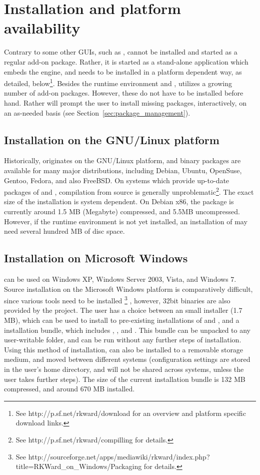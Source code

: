 \section{Installation and platform availability}
\label{sec:installing_starting_RKWard}
Contrary to some other  GUIs, such as ,  cannot be installed and started as a
regular  add-on package. Rather, it is started as a stand-alone application which embeds the
 engine, and needs to be installed in a platform dependent way, as detailed, below\footnote{
  See http://p.sf.net/rkward/download for an overview and platform specific download links.
}. Besides the
 runtime environment and ,  utilizes a growing number of  add-on packages.
However, these do not have to be installed before hand. Rather  will prompt the user to install
missing packages, interactively, on an as-needed basis (see Section~\ref{sec:package_management}).

\subsection{Installation on the GNU/Linux platform}
Historically,  originates on the GNU/Linux platform, and binary packages are available for many major
distributions, including Debian, Ubuntu, OpenSuse, Gentoo, Fedora, and also FreeBSD. On systems which
provide up-to-date packages of  and , compilation from source is generally unproblematic\footnote{
  See http://p.sf.net/rkward/compilling for details.
}. The exact size of the installation is system dependent. On Debian x86, the package is currently around 1.5 MB (Megabyte) compressed,
and 5.5MB uncompressed. However, if the  runtime environment is not yet installed, an installation of  may
need several hundred MB of disc space.

\subsection{Installation on Microsoft Windows}
 can be used on Windows XP, Windows Server 2003, Vista, and Windows 7. Source installation on the
Microsoft Windows platform is comparatively difficult, since various tools need to be installed
\footnote{
  See http://sourceforge.net/apps/mediawiki/rkward/index.php?title=RKWard\_on\_Windows/Packaging for details.
}
, however, 32bit binaries are also provided by the project. The user has a choice between an small installer (1.7 MB),
which can be used to install  to pre-existing installations of  and , and a installation
bundle, which includes , , and . This bundle can be unpacked to any user-writable folder,
and can be run without any further steps of installation. Using this method of installation,
 can also be installed to a removable storage medium, and moved between different systems (configuration
settings are stored in the user's home directory, and will not be shared across systems, unless the user takes further steps).
The size of the current installation bundle is 132 MB compressed, and around 670 MB installed.

